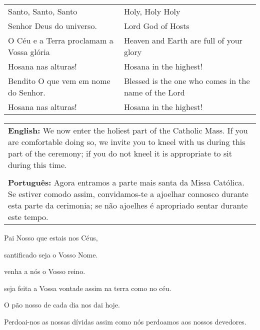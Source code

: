 \newpage


\begin{longtable}{L{1.7in}R{1.7in}}
  Santo, Santo, Santo & Holy, Holy Holy \\
  Senhor Deus do universo. & Lord God of Hosts\\

  O Céu e a Terra proclamam a Vossa glória & Heaven and Earth are full of your glory\\

  Hosana nas alturas! & Hosana in the highest! \\

  Bendito O que vem em nome do Senhor. & Blessed is the one who comes in the name of the Lord\\

  Hosana nas alturas! & Hosana in the highest!\\
\end{longtable}





\begin{tabular}{p{3.5in}}
{\bf English:} We now enter the holiest part of the Catholic Mass.
If you are comfortable doing so, we invite you to kneel with us during this part of the ceremony; if you do not kneel it is appropriate to sit during this time.
\\
\\
{\bf Português:} Agora entramos a parte mais santa da Missa Católica.
  Se estiver comodo assim, convidamos-te a ajoelhar connosco durante esta parte da cerimonia; se não ajoelhes é apropriado sentar durante este tempo.\\
\end{tabular}

\centering

\newpage


Pai Nosso que estais nos Céus,

santificado seja o Vosso Nome. 

venha a nós o Vosso reino. 

seja feita a Vossa vontade assim na terra como no céu. 

O pão nosso de cada dia nos dai hoje. 

Perdoai-nos as nossas dívidas assim como nós perdoamos aos nossos devedores. 

